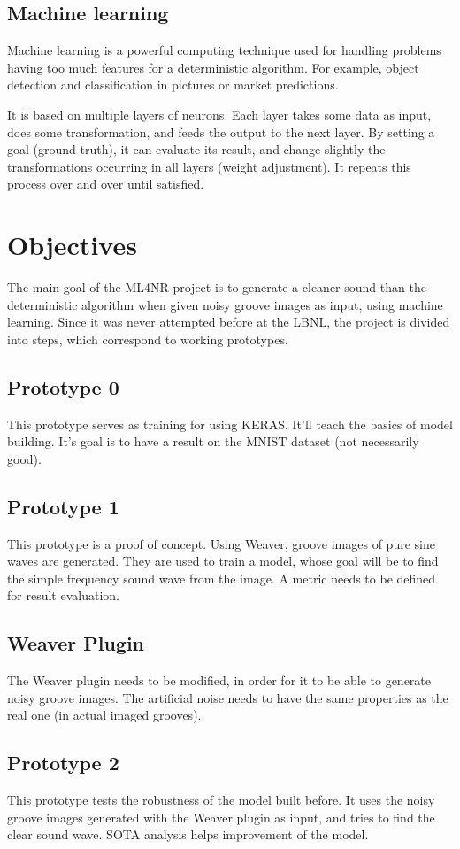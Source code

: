 \documentclass[12pt, twoside]{article}
\begin{document}
\subsection{Machine learning}
Machine learning is a powerful computing technique used for handling problems having too much features for a deterministic algorithm. For example, object detection and classification in pictures or market predictions.

It is based on multiple layers of neurons. Each layer takes some data as input, does some transformation, and feeds the output to the next layer. By setting a goal (ground-truth), it can evaluate its result, and change slightly the transformations occurring in all layers (weight adjustment). It repeats this process over and over until satisfied.
\section{Objectives}
The main goal of the ML4NR project is to generate a cleaner sound than the deterministic algorithm when given noisy groove images as input, using machine learning. Since it was never attempted before at the LBNL, the project is divided into steps, which correspond to working prototypes.
\subsection{Prototype 0}
This prototype serves as training for using KERAS. It'll teach the basics of model building. It's goal is to have a result on the MNIST dataset (not necessarily good). 
\subsection{Prototype 1}
This prototype is a proof of concept. Using Weaver, groove images of pure sine waves are generated. They are used to train a model, whose goal will be to find the simple frequency sound wave from the image. A metric needs to be defined for result evaluation.
\subsection{Weaver Plugin}
The Weaver plugin needs to be modified, in order for it to be able to generate noisy groove images. The artificial noise needs to have the same properties as the real one (in actual imaged grooves).
\subsection{Prototype 2}
This prototype tests the robustness of the model built before. It uses the noisy groove images generated with the Weaver plugin as input, and tries to find the clear sound wave. SOTA analysis helps improvement of the model.
\end{document}
